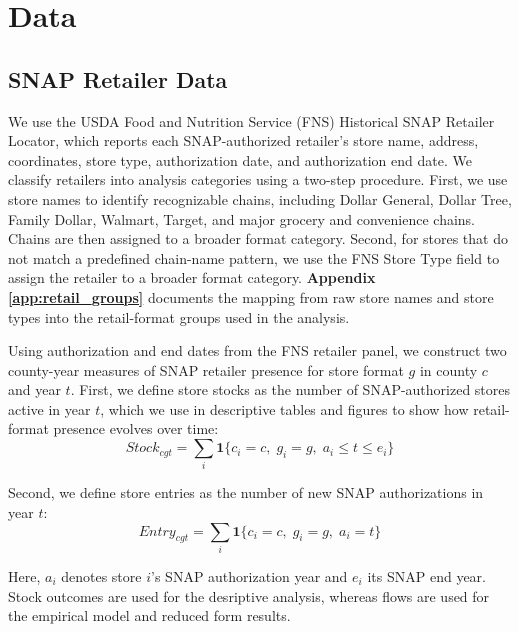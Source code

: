 \documentclass[12pt]{article}
\begin{document}



\section{Data}

\subsection{SNAP Retailer Data}

We use the USDA Food and Nutrition Service (FNS) Historical SNAP Retailer Locator, which reports each SNAP-authorized retailer’s store name, address, coordinates, store type, authorization date, and authorization end date. We classify retailers into analysis categories using a two-step procedure. First, we use store names to identify recognizable chains, including Dollar General, Dollar Tree, Family Dollar, Walmart, Target, and major grocery and convenience chains. Chains are then assigned to a broader format category. Second, for stores that do not match a predefined chain-name pattern, we use the FNS Store Type field to assign the retailer to a broader format category. \textbf{Appendix \ref{app:retail_groups}} documents the mapping from raw store names and store types into the retail-format groups used in the analysis.

Using authorization and end dates from the FNS retailer panel, we construct two county-year measures of SNAP retailer presence for store format \(g\) in county \(c\) and year \(t\). First, we define store stocks as the number of SNAP-authorized stores active in year \(t\), which we use in descriptive tables and figures to show how retail-format presence evolves over time:
\begin{equation}
    Stock_{cgt} = \sum_i \mathbf{1}\{c_i = c,\; g_i = g,\; a_i \le t \le e_i\}
\end{equation}

Second, we define store entries as the number of new SNAP authorizations in year \(t\):
\begin{equation}
    Entry_{cgt} = \sum_i \mathbf{1}\{c_i = c,\; g_i = g,\; a_i = t\}
\end{equation}

Here, \(a_i\) denotes store \(i\)’s SNAP authorization year and \(e_i\) its SNAP end year. Stock outcomes are used for the desriptive analysis, whereas flows are used for the empirical model and reduced form results.
\end{document}
